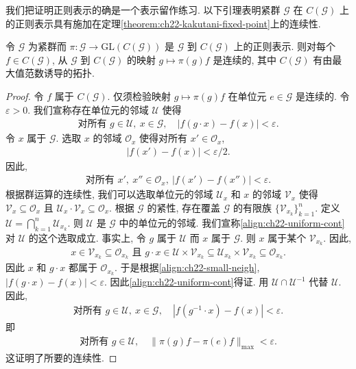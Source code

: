 \documentclass[../../main.tex]{subfiles}
\begin{document}
我们把证明正则表示的确是一个表示留作练习. 以下引理表明紧群 $\mathcal{G}$ 在 $C(\mathcal{G})$ 上的正则表示具有施加在定理\cref{theorem:ch22-kakutani-fixed-point}上的连续性.

\begin{lemma}[正则表示的连续性]\label{lemma:ch22-regular-continuity}
令 $\mathcal{G}$ 为紧群而 $\pi:\mathcal{G}\to\mathrm{GL}(C(\mathcal{G}))$ 是 $\mathcal{G}$ 到 $C(\mathcal{G})$ 上的正则表示. 则对每个 $f\in C(\mathcal{G})$, 从 $\mathcal{G}$ 到 $C(\mathcal{G})$ 的映射 $g\mapsto\pi(g)f$ 是连续的, 其中 $C(\mathcal{G})$ 有由最大值范数诱导的拓扑.
\end{lemma}

\begin{proof}
令 $f$ 属于 $C(\mathcal{G})$. 仅须检验映射 $g\mapsto\pi(g)f$ 在单位元 $e\in\mathcal{G}$ 是连续的. 令 $\varepsilon>0$. 我们宣称存在单位元的邻域 $\mathcal{U}$ 使得
\begin{align}
\text{对所有 }g\in\mathcal{U},\ x\in\mathcal{G},\quad|f(g\cdot x)-f(x)|<\varepsilon.
\label{align:ch22-uniform-cont}
\end{align}
令 $x$ 属于 $\mathcal{G}$. 选取 $x$ 的邻域 $\mathcal{O}_{x}$ 使得对所有 $x'\in\mathcal{O}_{x}$,
\begin{align*}
|f(x')-f(x)|<\varepsilon/2.
\end{align*}
因此,
\begin{align}
\text{对所有 }x',\ x''\in\mathcal{O}_{x},\ |f(x')-f(x'')|<\varepsilon.
\label{align:ch22-small-neigh}
\end{align}
根据群运算的连续性, 我们可以选取单位元的邻域 $\mathcal{U}_{x}$ 和 $x$ 的邻域 $\mathcal{V}_{x}$ 使得 $\mathcal{V}_{x}\subseteq\mathcal{O}_{x}$ 且 $\mathcal{U}_{x}\cdot\mathcal{V}_{x}\subseteq\mathcal{O}_{x}$. 根据 $\mathcal{G}$ 的紧性, 存在覆盖 $\mathcal{G}$ 的有限族 $\{\mathcal{V}_{x_{k}}\}_{k=1}^{n}$. 定义 $\mathcal{U}=\bigcap_{k=1}^{n}\mathcal{U}_{x_{k}}$. 则 $\mathcal{U}$ 是 $\mathcal{G}$ 中的单位元的邻域. 我们宣称\eqref{align:ch22-uniform-cont}对 $\mathcal{U}$ 的这个选取成立. 事实上, 令 $g$ 属于 $\mathcal{U}$ 而 $x$ 属于 $\mathcal{G}$. 则 $x$ 属于某个 $\mathcal{V}_{x_{k}}$. 因此,
\begin{align*}
x\in\mathcal{V}_{x_{k}}\subseteq\mathcal{O}_{x_{k}}\text{ 且 }g\cdot x\in\mathcal{U}\times\mathcal{V}_{x_{k}}\subseteq\mathcal{U}_{x_{k}}\times\mathcal{V}_{x_{k}}\subseteq\mathcal{O}_{x_{k}}.
\end{align*}
因此 $x$ 和 $g\cdot x$ 都属于 $\mathcal{O}_{x_{k}}$. 于是根据\eqref{align:ch22-small-neigh}, $|f(g\cdot x)-f(x)|<\varepsilon$. 因此\eqref{align:ch22-uniform-cont}得证. 用 $\mathcal{U}\cap\mathcal{U}^{-1}$ 代替 $\mathcal{U}$. 因此,
\begin{align*}
\text{对所有 }g\in\mathcal{U},\ x\in\mathcal{G},\quad|f(g^{-1}\cdot x)-f(x)|<\varepsilon.
\end{align*}
即
\begin{align*}
\text{对所有 }g\in\mathcal{U},\quad\|\pi(g)f-\pi(e)f\|_{\max}<\varepsilon.
\end{align*}
这证明了所要的连续性.
\end{proof}
\end{document}
